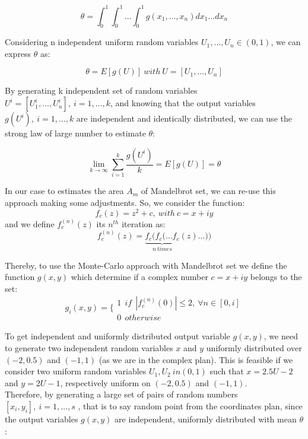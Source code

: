 \documentclass{article}
\begin{document}
    \begin{equation}
        \theta = \int_{0}^{1} \int_{0}^{1} \ldots \int_{0}^{1} g(x_1, \ldots, x_n) dx_1 \ldots dx_n
    \end{equation}

    Considering n independent uniform random variables $U_1, \ldots, U_n \in (0, 1)$, we can express $\theta$ as:

    \begin{equation}
        \theta = E[g(U)]\ with\ U=[U_1, \ldots, U_n]
    \end{equation}

    By generating k independent set of random variables $U^i=[U_1^i, \ldots, U_n^i],\ i=1, \ldots, k$, and knowing that the output variables $g(U^i),\ i=1, \ldots, k$ are independent and identically distributed, we can use the strong law of large number to estimate $\theta$:

    \begin{equation}
        \lim_{k \to \infty} \sum_{i=1}^{k} \frac{g(U^i)}{k} = E[g(U)] = \theta
    \end{equation}

    In our case to estimates the area $A_m$ of Mandelbrot set, we can re-use this approach making some adjustments. So, we consider the function:
    \begin{equation}
        f_c(z) = z^2 + c,\ with\ c= x + i y
    \end{equation}
    and we define $f_c^{(n)}(z)$ its $n^{th}$ iteration as:
    \begin{equation}
        f_c^{(n)}(z) = \underbrace{f_c(f_c( \ldots f_c}_{n\ times}(z) \ldots ))
    \end{equation}

    Thereby, to use the Monte-Carlo approach with Mandelbrot set we define the function $g(x, y)$ which determine if a complex number $c = x + iy$ belongs to the set:
    \begin{equation}
        g_{i}(x, y) =
        \Bigg\{
        \begin{array}{l}
            1\ \ if\ \ |f_c^{(n)}(0)| \leq 2,\ \forall n \in [0, i]\\
            0\ \ otherwise
        \end{array}
    \end{equation}

    To get independent and uniformly distributed output variable $g(x, y)$, we need to generate two independent random variables $x$ and $y$ uniformly distributed over $(-2, 0.5)$ and $(-1, 1)$ (as we are in the complex plan). This is feasible if we consider two uniform random variables $U_1, U_2 \ in (0, 1)$ such that $x = 2.5U - 2$ and $y = 2U - 1$, respectively uniform on $(-2, 0.5)$ and $(-1, 1)$.\\
    Therefore, by generating a large set of pairs of random numbers $[x_i, y_i],\ i=1, \ldots, s$ , that is to say random point from the coordinates plan, since the output variables $g(x, y)$ are independent, uniformly distributed with mean $\theta$:
\end{document}
